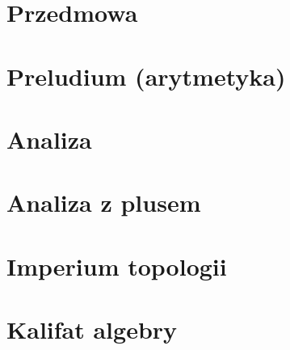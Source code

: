\tableofcontents
\newpage

\chapter*{Przedmowa}
	
	\newpage

\chapter{Preludium (arytmetyka)}
	
	
	
	
	
	
	
\chapter{Analiza}
	
	
	
	

\chapter{Analiza z plusem}
	
	
	
	
	

\chapter{Imperium topologii}

\chapter{Kalifat algebry}

